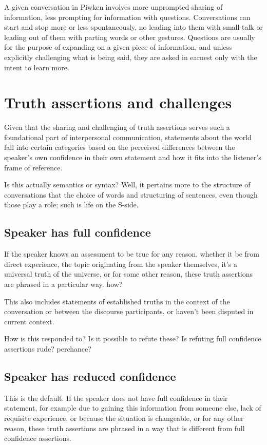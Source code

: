 \documentclass[smallroyalvopaper,9pt]{memoir}
\newcommand{\langeng}{Piwken}
\begin{document}
A given conversation in \langeng{} involves more unprompted sharing of information, less prompting for information with questions. Conversations can start and stop more or less spontaneously, no leading into them with small-talk or leading out of them with parting words or other gestures. Questions are usually for the purpose of expanding on a given piece of information, and unless explicitly challenging what is being said, they are asked in earnest only with the intent to learn more. 

\chapter{Truth assertions and challenges}

Given that the sharing and challenging of truth assertions serves such a foundational part of interpersonal communication, statements about the world fall into certain categories based on the perceived differences between the speaker's own confidence in their own statement and how it fits into the listener's frame of reference. 

Is this actually semantics or syntax? Well, it pertains more to the structure of conversations that the choice of words and structuring of sentences, even though those play a role; such is life on the S-side.

\section{Speaker has full confidence}

If the speaker knows an assessment to be true for any reason, whether it be from direct experience, the topic originating from the speaker themselves, it's a universal truth of the universe, or for some other reason, these truth assertions are phrased in a particular way. how? 

This also includes statements of established truths in the context of the conversation or between the discourse participants, or haven't been disputed in current context.

How is this responded to? Is it possible to refute these? Is refuting full confidence assertions rude? perchance?

\section{Speaker has reduced confidence}

This is the default.
If the speaker does not have full confidence in their statement, for example due to gaining this information from someone else, lack of requisite experience, or because the situation is changeable, or for any other reason, these truth assertions are phrased in a way that is different from full confidence assertions. 
\end{document}
